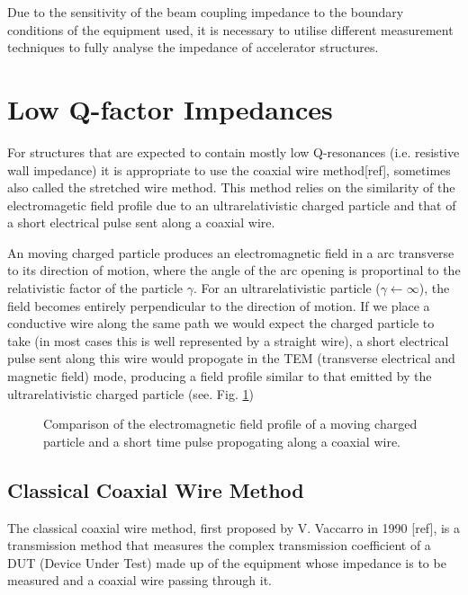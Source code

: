 

Due to the sensitivity of the beam coupling impedance to the boundary conditions of the equipment used, it is necessary to utilise different measurement techniques to fully analyse the impedance of accelerator structures.

\section{Low Q-factor Impedances}

For structures that are expected to contain mostly low Q-resonances (i.e. resistive wall impedance) it is appropriate to use the coaxial wire method[ref], sometimes also called the stretched wire method. This method relies on the similarity of the electromagetic field profile due to an ultrarelativistic charged particle and that of a short electrical pulse sent along a coaxial wire. 

An moving charged particle produces an electromagnetic field in a arc transverse to its direction of motion, where the angle of the arc opening is proportinal to the relativistic factor of the particle $\gamma$. For an ultrarelativistic particle ($\gamma \leftarrow \infty$), the field becomes entirely perpendicular to the direction of motion. If we place a conductive wire along the same path we would expect the charged particle to take (in most cases this is well represented by a straight wire), a short electrical pulse sent along this wire would propogate in the TEM (transverse electrical and magnetic field) mode, producing a field profile similar to that emitted by the ultrarelativistic charged particle (see. Fig. \ref{fig:coax-part-profile})


\begin{figure}

\caption{Comparison of the electromagnetic field profile of a moving charged particle and a short time pulse propogating along a coaxial wire.}
\label{fig:coax-part-profile}
\end{figure}

\subsection{Classical Coaxial Wire Method}

The classical coaxial wire method, first proposed by V. Vaccarro in 1990 [ref], is a transmission method that measures the complex transmission coefficient of a DUT (Device Under Test) made up of the equipment whose impedance is to be measured and a coaxial wire passing through it. 

